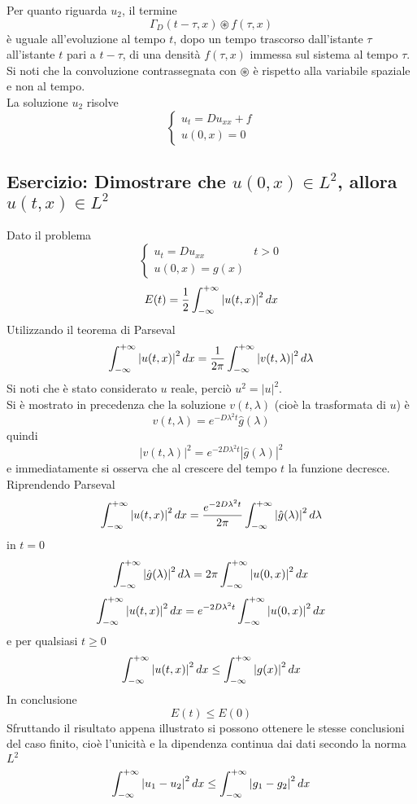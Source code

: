 Per quanto riguarda $u_2$, il termine
\[
	\Gamma_D(t-\tau, x) 
	\circledast f(\tau, x)
\]
\`e uguale all'evoluzione al tempo $t$, dopo un tempo trascorso dall'istante 
$\tau$ all'istante $t$ pari a $t-\tau$, di una densit\`a $f(\tau, x)$ immessa
sul sistema al tempo $\tau$. Si noti che la convoluzione contrassegnata con 
$\circledast$ \`e rispetto alla variabile spaziale e non al tempo.\\
La soluzione $u_2$ risolve
\[
	\left\{ 
	\begin{array}{l}
		u_t=Du_{xx} +f \\
		u(0,x)= 0
	\end{array}
	\right.
\]
\subsection{\texorpdfstring
{Esercizio: Dimostrare che $u(0,x) \in L^2$, allora $u(t,x) \in L^2$}
{Esercizio: Dimostrare che se u(0,x) \`e a quadrato sommabile, 
allora lo \`e anche u(t,x)}}
Dato il problema
\[
	\left\{ 
	\begin{array}{ll}
		u_t=Du_{xx} & t>0\\
		u(0,x)= g(x)
	\end{array}
	\right.
\]
\[
	E(t)= \frac{1}{2}\int_{- \infty}^{+ \infty} \left| u(t,x)\right|^2 dx
\]
Utilizzando il teorema di Parseval
\[
	\int_{- \infty}^{+ \infty} \left| u(t,x)\right|^2dx
	= \frac{1}{2\pi} \int_{- \infty}^{+ \infty} \left| v(t,\lambda) \right|^2 d\lambda
\]
Si noti che \`e stato considerato $u$ reale, perci\`o $u^2= |u|^2$.\\
Si \`e mostrato in precedenza che la soluzione $v(t,\lambda)$ (cio\`e la 
trasformata di $u$) \`e
\[
	v(t,\lambda)= e^{-D\lambda^2 t} \hat{g}(\lambda)
\]
quindi
\[
	\left| v(t,\lambda) \right|^2 = e^{-2D\lambda^2 t} 
	\left| \hat{g}(\lambda) \right|^2
\]
e immediatamente si osserva che al crescere del tempo $t$ 
la funzione decresce.\\
Riprendendo Parseval
\[
	\int_{- \infty}^{+ \infty} \left| u(t,x)\right|^2 dx= \frac{e^{-2D\lambda^2 t}}{2\pi}
	\int_{- \infty}^{+ \infty} \left| \hat{g}(\lambda) \right|^2 d\lambda
\]
in $t=0$
\[
	\int_{- \infty}^{+ \infty} \left| \hat{g}(\lambda) \right|^2 d\lambda=
	2\pi \int_{- \infty}^{+ \infty} \left| u(0,x)\right|^2 dx
\]
\[
	\int_{- \infty}^{+ \infty} \left| u(t,x)\right|^2 dx= e^{-2D\lambda^2 t}
	\int_{- \infty}^{+ \infty} \left| u(0,x)\right|^2 dx
\]
e per qualsiasi $t\geq 0$
\[
	\int_{- \infty}^{+ \infty} \left| u(t,x)\right|^2 dx \leq 
	\int_{- \infty}^{+ \infty} \left| g(x) \right|^2 dx
\]
In conclusione
\[
	E(t)\leq E(0)
\]
Sfruttando il risultato appena illustrato si possono ottenere le stesse
conclusioni del caso finito, cio\`e l'unicit\`a e la dipendenza continua
dai dati secondo la norma $L^2$
\[
	\int_{- \infty}^{+ \infty} \left| u_1-u_2 \right|^2 dx
	\leq
	\int_{- \infty}^{+ \infty} \left| g_1 - g_2 \right|^2 dx
\]
